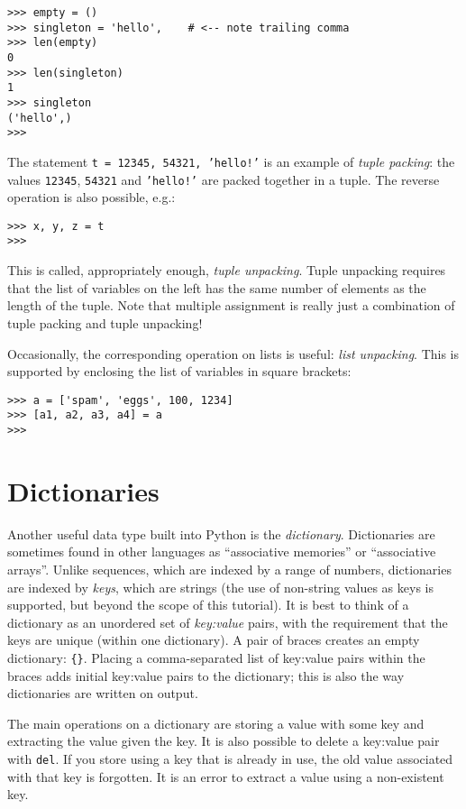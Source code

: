 \bcode\begin{verbatim}
>>> empty = ()
>>> singleton = 'hello',    # <-- note trailing comma
>>> len(empty)
0
>>> len(singleton)
1
>>> singleton
('hello',)
>>>
\end{verbatim}\ecode
%
The statement {\tt t = 12345, 54321, 'hello!'} is an example of {\em
tuple packing}: the values {\tt 12345}, {\tt 54321} and {\tt 'hello!'}
are packed together in a tuple.  The reverse operation is also
possible, e.g.:

\bcode\begin{verbatim}
>>> x, y, z = t
>>>
\end{verbatim}\ecode
%
This is called, appropriately enough, {\em tuple unpacking}.  Tuple
unpacking requires that the list of variables on the left has the same
number of elements as the length of the tuple.  Note that multiple
assignment is really just a combination of tuple packing and tuple
unpacking!

Occasionally, the corresponding operation on lists is useful: {\em list
unpacking}.  This is supported by enclosing the list of variables in
square brackets:

\bcode\begin{verbatim}
>>> a = ['spam', 'eggs', 100, 1234]
>>> [a1, a2, a3, a4] = a
>>>
\end{verbatim}\ecode

\section{Dictionaries}

Another useful data type built into Python is the {\em dictionary}.
Dictionaries are sometimes found in other languages as ``associative
memories'' or ``associative arrays''.  Unlike sequences, which are
indexed by a range of numbers, dictionaries are indexed by {\em keys},
which are strings (the use of non-string values as keys
is supported, but beyond the scope of this tutorial).
It is best to think of a dictionary as an unordered set of
{\em key:value} pairs, with the requirement that the keys are unique
(within one dictionary).
A pair of braces creates an empty dictionary: \verb/{}/.
Placing a comma-separated list of key:value pairs within the
braces adds initial key:value pairs to the dictionary; this is also the
way dictionaries are written on output.

The main operations on a dictionary are storing a value with some key
and extracting the value given the key.  It is also possible to delete
a key:value pair
with {\tt del}.
If you store using a key that is already in use, the old value
associated with that key is forgotten.  It is an error to extract a
value using a non-existent key.


